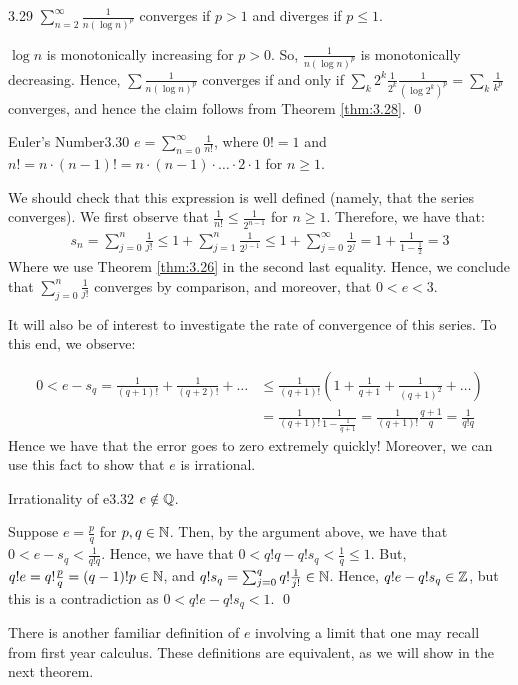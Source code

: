 \begin{theorem}{}{3.29}
    $\sum_{n=2}^\infty \frac{1}{n(\log n)^p}$ converges if $p > 1$ and diverges if $p \leq 1$.
\end{theorem}
\begin{nproof}
    $\log n$ is monotonically increasing for $p > 0$. So, $\frac{1}{n(\log n)^p}$ is monotonically decreasing. Hence, $\sum \frac{1}{n(\log n)^p}$ converges if and only if $\sum_k 2^k \frac{1}{2^k}\frac{1}{(\log 2^k)^p} = \sum_k \frac{1}{k^p}$ converges, and hence the claim follows from Theorem \ref{thm:3.28}. \qed
\end{nproof}

\begin{definition}{Euler's Number}{3.30}
    $e = \sum_{n=0}^\infty \frac{1}{n!}$, where $0! = 1$ and $n! = n\cdot (n-1)! = n \cdot (n-1) \cdot \ldots \cdot 2 \cdot 1$ for $n \geq 1$. 
\end{definition}
\noindent We should check that this expression is well defined (namely, that the series converges). We first observe that $\frac{1}{n!} \leq \frac{1}{2^{n-1}}$ for $n \geq 1$. Therefore, we have that:
\begin{align*}
    s_n = \sum_{j=0}^n \frac{1}{j!} \leq 1 + \sum_{j=1}^n \frac{1}{2^{j-1}} \leq 1 + \sum_{j=0}^\infty \frac{1}{2^j} = 1 + \frac{1}{1-\frac{1}{2}} = 3
\end{align*}
Where we use Theorem \ref{thm:3.26} in the second last equality. Hence, we conclude that $\sum_{j=0}^n \frac{1}{j!}$ converges by comparison, and moreover, that $0 < e < 3$. 

It will also be of interest to investigate the rate of convergence of this series. To this end, we observe:

\begin{align*}
    0 < e - s_q = \frac{1}{(q+1)!} + \frac{1}{(q+2)!} + \ldots &\leq \frac{1}{(q+1)!}\left(1 + \frac{1}{q+1} + \frac{1}{(q+1)^2} + \ldots \right) 
    \\ &= \frac{1}{(q+1)!}\frac{1}{1-\frac{1}{q+1}} = \frac{1}{(q+1)!}\frac{q+1}{q} = \frac{1}{q!q}
\end{align*}
Hence we have that the error goes to zero extremely quickly! Moreover, we can use this fact to show that $e$ is irrational.

\setcounter{rudin}{31}
\begin{theorem}{Irrationality of e}{3.32}
    $e \notin \mathbb{Q}$.
\end{theorem}
\begin{nproof}
    Suppose $e = \frac{p}{q}$ for $p, q \in \mathbb{N}$. Then, by the argument above, we have that $0 < e - s_q < \frac{1}{q!q}$. Hence, we have that $0 < q! q - q!s_q < \frac{1}{q} \leq 1$. But, $q!e = q!\frac{p}{q} = (q-1)!p \in \mathbb{N}$, and $q!s_q = \sum_{j=0}^q q!\frac{1}{j!} \in \mathbb{N}$. Hence, $q! e - q! s_q \in \mathbb{Z}$, but this is a contradiction as $0 < q! e  - q! s_q < 1$. \qed
\end{nproof}
\noindent There is another familiar definition of $e$ involving a limit that one may recall from first year calculus. These definitions are equivalent, as we will show in the next theorem.

